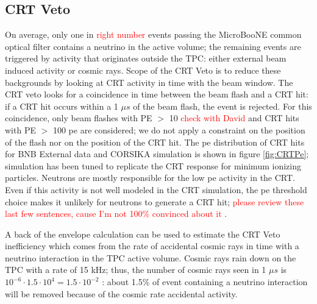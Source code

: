 \subsection{CRT Veto}\label{sec:VetoCuts}
On average, only one in \textcolor{red}{right number} events passing the MicroBooNE common optical filter contains a neutrino in the active volume; the remaining events are triggered by activity that originates outside the TPC: either external beam induced activity  or cosmic rays. Scope of the CRT Veto is to reduce these backgrounds by looking at CRT activity in time with the beam window. 
The CRT veto looks for a coincidence in time between the beam flash and a CRT hit: if a CRT hit occurs within a 1 $\mu s$ of the beam flash, the event is rejected. For this coincidence, only beam flashes with PE $>$ 10  \textcolor{red}{check with David} and CRT hits with PE $>$ 100 pe are considered; we do not apply a constraint on the position of the flash nor on the position of the CRT hit. The pe distribution of CRT hits for BNB External data and CORSIKA simulation is shown in figure \ref{fig:CRTPe};  simulation has been tuned to replicate the CRT response for minimum ionizing particles. Neutrons are mostly responsible for the low pe activity in the CRT. Even if this activity is not well modeled in the CRT simulation, the pe threshold choice makes it unlikely for neutrons to generate a CRT hit;   \textcolor{red}{ please review these last few sentences, cause I'm not 100\% convinced about it} . 

A back of the envelope calculation can be used to estimate the CRT Veto inefficiency which comes from the rate of accidental cosmic rays in time with a neutrino interaction in the TPC active volume. Cosmic rays rain down on the TPC with a rate of 15 kHz; thus, the number of cosmic rays seen in 1 $\mu s$ is $10^{-6} \cdot 1.5\cdot10^{4} = 1.5 \cdot10^{-2}$ : about 1.5\% of event containing a neutrino interaction will be removed because of the cosmic rate accidental activity. 
 
